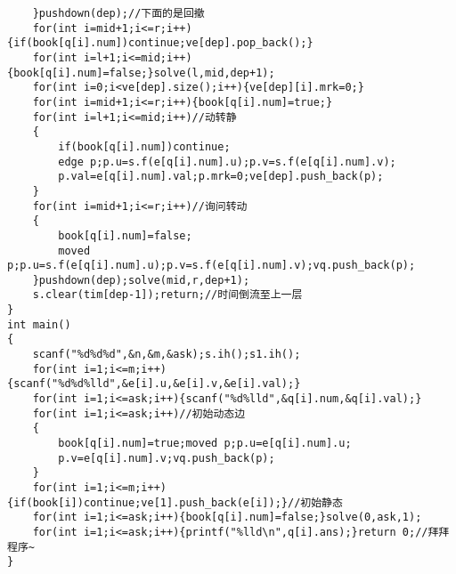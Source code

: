 \begin{verbatim}
    }pushdown(dep);//下面的是回撤
    for(int i=mid+1;i<=r;i++){if(book[q[i].num])continue;ve[dep].pop_back();}
    for(int i=l+1;i<=mid;i++){book[q[i].num]=false;}solve(l,mid,dep+1);
    for(int i=0;i<ve[dep].size();i++){ve[dep][i].mrk=0;}
    for(int i=mid+1;i<=r;i++){book[q[i].num]=true;}
    for(int i=l+1;i<=mid;i++)//动转静
    {
        if(book[q[i].num])continue;
        edge p;p.u=s.f(e[q[i].num].u);p.v=s.f(e[q[i].num].v);
        p.val=e[q[i].num].val;p.mrk=0;ve[dep].push_back(p);
    }
    for(int i=mid+1;i<=r;i++)//询问转动
    {
        book[q[i].num]=false;
        moved p;p.u=s.f(e[q[i].num].u);p.v=s.f(e[q[i].num].v);vq.push_back(p);
    }pushdown(dep);solve(mid,r,dep+1);
    s.clear(tim[dep-1]);return;//时间倒流至上一层
}
int main()
{
    scanf("%d%d%d",&n,&m,&ask);s.ih();s1.ih();
    for(int i=1;i<=m;i++){scanf("%d%d%lld",&e[i].u,&e[i].v,&e[i].val);}
    for(int i=1;i<=ask;i++){scanf("%d%lld",&q[i].num,&q[i].val);}
    for(int i=1;i<=ask;i++)//初始动态边
    {
        book[q[i].num]=true;moved p;p.u=e[q[i].num].u;
        p.v=e[q[i].num].v;vq.push_back(p);
    }
    for(int i=1;i<=m;i++){if(book[i])continue;ve[1].push_back(e[i]);}//初始静态
    for(int i=1;i<=ask;i++){book[q[i].num]=false;}solve(0,ask,1);
    for(int i=1;i<=ask;i++){printf("%lld\n",q[i].ans);}return 0;//拜拜程序~
}
\end{verbatim}

